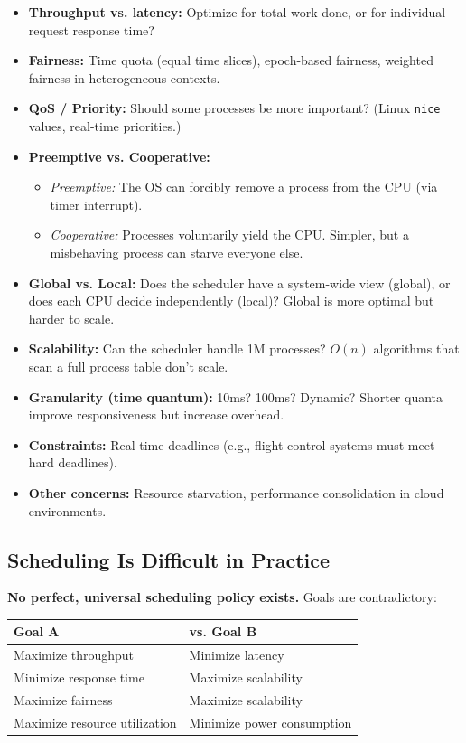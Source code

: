 \documentclass[11pt]{article}
\begin{document}
\begin{itemize}
    \item \textbf{Throughput vs. latency:} Optimize for total work done, or for individual request response time?
    \item \textbf{Fairness:} Time quota (equal time slices), epoch-based fairness, weighted fairness in heterogeneous contexts.
    \item \textbf{QoS / Priority:} Should some processes be more important? (Linux \texttt{nice} values, real-time priorities.)
    \item \textbf{Preemptive vs. Cooperative:}
    \begin{itemize}
        \item \emph{Preemptive:} The OS can forcibly remove a process from the CPU (via timer interrupt).
        \item \emph{Cooperative:} Processes voluntarily yield the CPU. Simpler, but a misbehaving process can starve everyone else.
    \end{itemize}
    \item \textbf{Global vs. Local:} Does the scheduler have a system-wide view (global), or does each CPU decide independently (local)? Global is more optimal but harder to scale.
    \item \textbf{Scalability:} Can the scheduler handle 1M processes? $O(n)$ algorithms that scan a full process table don't scale.
    \item \textbf{Granularity (time quantum):} 10ms? 100ms? Dynamic? Shorter quanta improve responsiveness but increase overhead.
    \item \textbf{Constraints:} Real-time deadlines (e.g., flight control systems must meet hard deadlines).
    \item \textbf{Other concerns:} Resource starvation, performance consolidation in cloud environments.
\end{itemize}

\subsection{Scheduling Is Difficult in Practice}

\textbf{No perfect, universal scheduling policy exists.} Goals are contradictory:

\begin{center}
\begin{tabular}{ll}
\toprule
\textbf{Goal A} & \textbf{vs. Goal B} \\
\midrule
Maximize throughput & Minimize latency \\
Minimize response time & Maximize scalability \\
Maximize fairness & Maximize scalability \\
Maximize resource utilization & Minimize power consumption \\
\bottomrule
\end{tabular}
\end{center}
\end{document}
